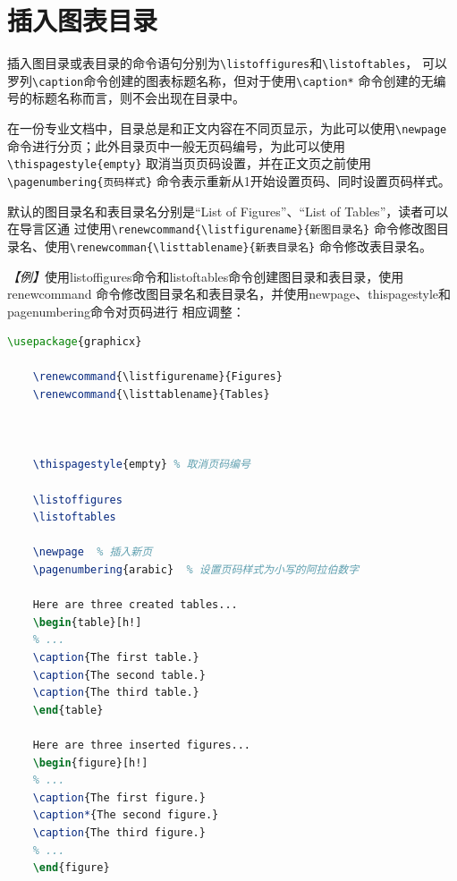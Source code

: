 \section{插入图表目录}

插入图目录或表目录的命令语句分别为\texttt{\textbackslash{}listoffigures}和\texttt{\textbackslash{}listoftables}，
可以罗列\texttt{\textbackslash{}caption}命令创建的图表标题名称，但对于使用\texttt{\textbackslash{}caption*}
命令创建的无编号的标题名称而言，则不会出现在目录中。

在一份专业文档中，目录总是和正文内容在不同页显示，为此可以使用\texttt{\textbackslash{}newpage}
命令进行分页；此外目录页中一般无页码编号，为此可以使用\texttt{\textbackslash{}thispagestyle\{empty\}}
取消当页页码设置，并在正文页之前使用\texttt{\textbackslash{}pagenumbering\{页码样式\}}
命令表示重新从1开始设置页码、同时设置页码样式。

默认的图目录名和表目录名分别是“List of Figures”、“List of Tables”，读者可以在导言区通
过使用\texttt{\textbackslash{}renewcommand\{\textbackslash{}listfigurename\}\{新图目录名\}}
命令修改图目录名、使用\texttt{\textbackslash{}renewcomman\{\textbackslash{}listtablename\}\{新表目录名\}}
命令修改表目录名。

\emph{【例】}使用listoffigures命令和listoftables命令创建图目录和表目录，使用renewcommand
命令修改图目录名和表目录名，并使用newpage、thispagestyle和pagenumbering命令对页码进行
相应调整：
\begin{lstlisting}[language=TeX]
    \usepackage{graphicx}

    \renewcommand{\listfigurename}{Figures}
    \renewcommand{\listtablename}{Tables}

    

    \thispagestyle{empty} % 取消页码编号

    \listoffigures
    \listoftables

    \newpage  % 插入新页
    \pagenumbering{arabic}  % 设置页码样式为小写的阿拉伯数字

    Here are three created tables...
    \begin{table}[h!]
    % ...
    \caption{The first table.}
    \caption{The second table.}
    \caption{The third table.}
    \end{table}

    Here are three inserted figures...
    \begin{figure}[h!]
    % ...
    \caption{The first figure.}
    \caption*{The second figure.}
    \caption{The third figure.}
    % ...
    \end{figure}

    
\end{lstlisting}

